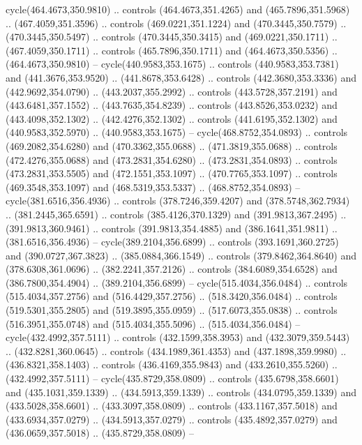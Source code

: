 \begin{scope}[cm={{1.25,0.0,0.0,-1.25,(0.0,743.43331)}}]
    cycle(464.4673,350.9810) .. controls (464.4673,351.4265) and
    (465.7896,351.5968) .. (467.4059,351.3596) .. controls (469.0221,351.1224) and
    (470.3445,350.7579) .. (470.3445,350.5497) .. controls (470.3445,350.3415) and
    (469.0221,350.1711) .. (467.4059,350.1711) .. controls (465.7896,350.1711) and
    (464.4673,350.5356) .. (464.4673,350.9810) -- cycle(440.9583,353.1675) ..
    controls (440.9583,353.7381) and (441.3676,353.9520) .. (441.8678,353.6428) ..
    controls (442.3680,353.3336) and (442.9692,354.0790) .. (443.2037,355.2992) ..
    controls (443.5728,357.2191) and (443.6481,357.1552) .. (443.7635,354.8239) ..
    controls (443.8526,353.0232) and (443.4098,352.1302) .. (442.4276,352.1302) ..
    controls (441.6195,352.1302) and (440.9583,352.5970) .. (440.9583,353.1675) --
    cycle(468.8752,354.0893) .. controls (469.2082,354.6280) and
    (470.3362,355.0688) .. (471.3819,355.0688) .. controls (472.4276,355.0688) and
    (473.2831,354.6280) .. (473.2831,354.0893) .. controls (473.2831,353.5505) and
    (472.1551,353.1097) .. (470.7765,353.1097) .. controls (469.3548,353.1097) and
    (468.5319,353.5337) .. (468.8752,354.0893) -- cycle(381.6516,356.4936) ..
    controls (378.7246,359.4207) and (378.5748,362.7934) .. (381.2445,365.6591) ..
    controls (385.4126,370.1329) and (391.9813,367.2495) .. (391.9813,360.9461) ..
    controls (391.9813,354.4885) and (386.1641,351.9811) .. (381.6516,356.4936) --
    cycle(389.2104,356.6899) .. controls (393.1691,360.2725) and
    (390.0727,367.3823) .. (385.0884,366.1549) .. controls (379.8462,364.8640) and
    (378.6308,361.0696) .. (382.2241,357.2126) .. controls (384.6089,354.6528) and
    (386.7800,354.4904) .. (389.2104,356.6899) -- cycle(515.4034,356.0484) ..
    controls (515.4034,357.2756) and (516.4429,357.2756) .. (518.3420,356.0484) ..
    controls (519.5301,355.2805) and (519.3895,355.0959) .. (517.6073,355.0838) ..
    controls (516.3951,355.0748) and (515.4034,355.5096) .. (515.4034,356.0484) --
    cycle(432.4992,357.5111) .. controls (432.1599,358.3953) and
    (432.3079,359.5443) .. (432.8281,360.0645) .. controls (434.1989,361.4353) and
    (437.1898,359.9980) .. (436.8321,358.1403) .. controls (436.4169,355.9843) and
    (433.2610,355.5260) .. (432.4992,357.5111) -- cycle(435.8729,358.0809) ..
    controls (435.6798,358.6601) and (435.1031,359.1339) .. (434.5913,359.1339) ..
    controls (434.0795,359.1339) and (433.5028,358.6601) .. (433.3097,358.0809) ..
    controls (433.1167,357.5018) and (433.6934,357.0279) .. (434.5913,357.0279) ..
    controls (435.4892,357.0279) and (436.0659,357.5018) .. (435.8729,358.0809) --

\end{scope}
